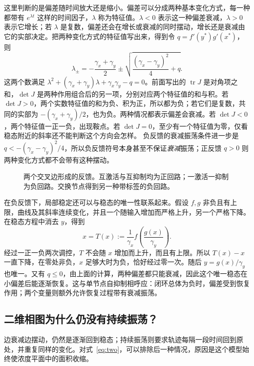 \documentclass[11pt,a4paper,UTF8,fontset=fandol]{ctexart}
\begin{document}
这里判断的是偏差随时间放大还是缩小。偏差可以分成两种基本变化方式，每一种都带有 $e^{\lambda t}$ 这样的时间因子，$\lambda$ 称为特征值。$\lambda<0$ 表示这一种偏差衰减，$\lambda>0$ 表示它增长；若 $\lambda$ 是复数，偏差还会在增长或衰减的同时摆动，增长还是衰减由它的实部决定。把两种变化方式的特征值写出来，得到令 $q=f'(y^*)g'(x^*)$，则
\[
\lambda_{\pm}=-\frac{\gamma_x+\gamma_y}{2}
\pm\sqrt{\frac{(\gamma_x-\gamma_y)^2}{4}+q}.
\]
这两个数满足 $\lambda^2+(\gamma_x+\gamma_y)\lambda+\gamma_x\gamma_y-q=0$。前面写出的 $\operatorname{tr}J$ 是对角项之和，$\det J$ 是两种作用组合后的另一项，分别对应两个特征值的和与积。若 $\det J>0$，两个实数特征值的和为负、积为正，所以都为负；若它们是复数，共同的实部为 $-(\gamma_x+\gamma_y)/2$，也为负。两种情况都表示偏差会衰减。若 $\det J<0$，两个特征值一正一负，出现鞍点。若 $\det J=0$，至少有一个特征值为零，仅看稳态附近的斜率还不能判断这个方向会怎样。
负反馈的衰减振荡条件进一步是
$q<-(\gamma_x-\gamma_y)^2/4$，所以负反馈符号本身甚至不保证\emph{衰减}振荡；正反馈 $q>0$ 则两种变化方式都不会带有这种摆动。
\begin{figure}[H]\centering
{}
\caption{两个交叉边形成的反馈。互激活与互抑制均为正回路；一激活一抑制为负回路。交换节点得到另一种带标签的负回路。}
\end{figure}

在负反馈下，局部稳定还可以与稳态的唯一性联系起来。假设 $f,g$ 非负且有上限，曲线及其斜率连续变化，并且一个随输入增加而严格上升，另一个严格下降。在稳态方程中消去 $y$，得到
\[
x=T(x):=\frac1{\gamma_x}f\!\left(\frac{g(x)}{\gamma_y}\right).
\]
经过一正一负两次调控，$T$ 不会随 $x$ 增加而上升，而且有上限。所以 $T(x)-x$ 一直下降，在零处非负，$x$ 足够大时为负，恰好经过零一次。随后 $y=g(x)/\gamma_y$ 也唯一。又有 $q\leq0$，由上面的计算，两种偏差都只能衰减，因此这个唯一稳态在小偏差后能逐渐恢复。这与单节点自抑制相呼应：闭环总体为负时，偏差受到恢复作用；两个变量则额外允许恢复过程带有衰减振荡。

\subsection{二维相图为什么仍没有持续振荡？}
边衰减边摆动，仍然是逐渐回到稳态；持续振荡则要求轨迹每隔一段时间回到原处，并重复同样的变化。对式~\eqref{eq:two}，可以排除后一种情况，原因是这个模型始终使浓度平面中的面积收缩。
\end{document}
